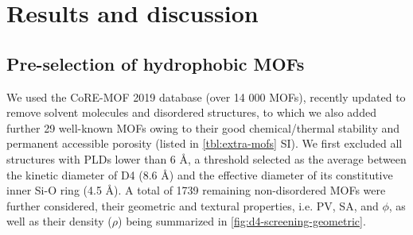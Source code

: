 \section{Results and discussion}\label{results-and-discussion}

\subsection{Pre-selection of hydrophobic MOFs}\label{pre-screening}

We used the CoRE-MOF 2019 database \citep{chungAdvancesUpdatesAnalytics2019}
(over 14 000 MOFs), recently updated to remove solvent molecules and disordered
structures, to which we also added further 29 well-known MOFs owing to their
good chemical/thermal stability and permanent accessible porosity (listed in
\cref{tbl:extra-mofs} SI). We first excluded all structures with PLDs lower than
6 Å, a threshold selected as the average between the kinetic diameter of D4 (8.6
Å) and the effective diameter of its constitutive inner Si-O ring (4.5 Å). A
total of 1739 remaining non-disordered MOFs were further considered, their
geometric and textural properties, i.e. PV, SA, and \(\phi\), as well as their
density (\(\rho\)) being summarized in \cref{fig:d4-screening-geometric}.

